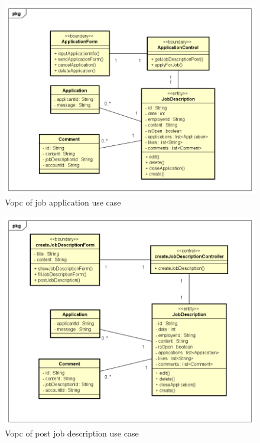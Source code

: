 \documentclass[a4paper]{article}
\begin{document}
\begin{figure}[H]
  \centering
  \includegraphics[width=1.0\textwidth]{vopc_job_application.png}
  \caption{Vopc of job application use case}
  \label{fig:fig25}
\end{figure}

\begin{figure}[H]
  \centering
  \includegraphics[width=1.0\textwidth]{vopc_post_jd.png}
  \caption{Vopc of post job description use case}
  \label{fig:fig26}
\end{figure}
\end{document}
